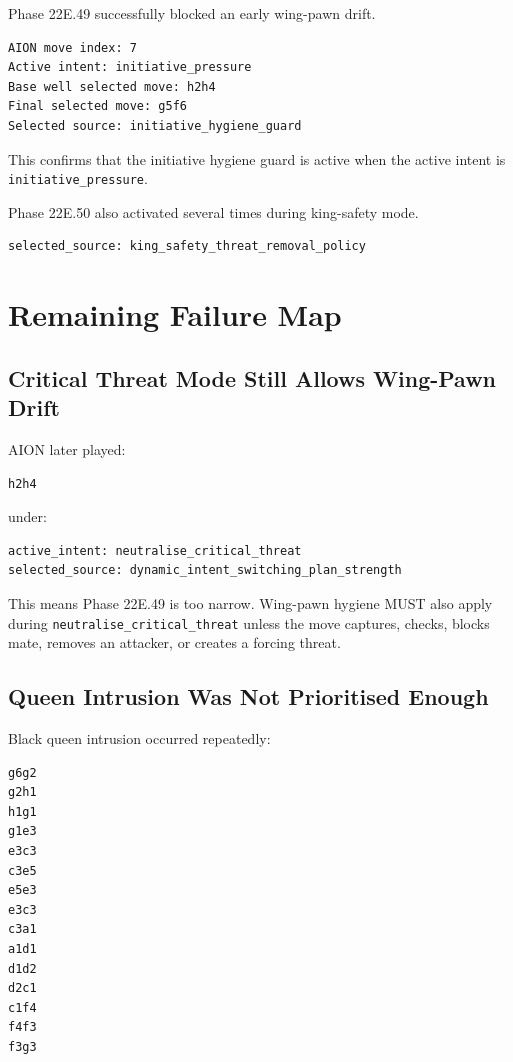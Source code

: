 \documentclass[11pt,a4paper]{article}
\begin{document}
Phase 22E.49 successfully blocked an early wing-pawn drift.

\begin{verbatim}
AION move index: 7
Active intent: initiative_pressure
Base well selected move: h2h4
Final selected move: g5f6
Selected source: initiative_hygiene_guard
\end{verbatim}

This confirms that the initiative hygiene guard is active when the active intent is \texttt{initiative\_pressure}.

Phase 22E.50 also activated several times during king-safety mode.

\begin{verbatim}
selected_source: king_safety_threat_removal_policy
\end{verbatim}

\section{Remaining Failure Map}

\subsection{Critical Threat Mode Still Allows Wing-Pawn Drift}

AION later played:

\begin{verbatim}
h2h4
\end{verbatim}

under:

\begin{verbatim}
active_intent: neutralise_critical_threat
selected_source: dynamic_intent_switching_plan_strength
\end{verbatim}

This means Phase 22E.49 is too narrow. Wing-pawn hygiene MUST also apply during \texttt{neutralise\_critical\_threat} unless the move captures, checks, blocks mate, removes an attacker, or creates a forcing threat.

\subsection{Queen Intrusion Was Not Prioritised Enough}

Black queen intrusion occurred repeatedly:

\begin{verbatim}
g6g2
g2h1
h1g1
g1e3
e3c3
c3e5
e5e3
e3c3
c3a1
a1d1
d1d2
d2c1
c1f4
f4f3
f3g3
\end{verbatim}
\end{document}
